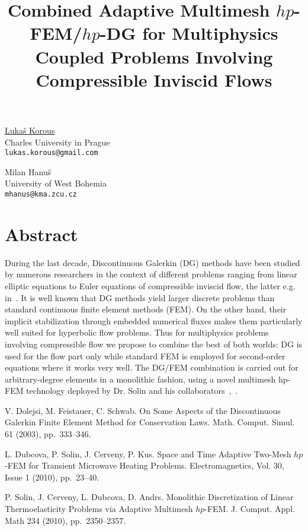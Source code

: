 \title{Combined Adaptive Multimesh $hp$-FEM/$hp$-DG for Multiphysics Coupled Problems Involving Compressible Inviscid Flows}
\author{} \institute{}
\maketitle

\begin{center}
{\large \underline{Luka\v s Korous}}\\
Charles University in Prague\\
{\tt lukas.korous@gmail.com}\\
\vspace{4mm}

{\large Milan Hanu\v s}\\
University of West Bohemia\\
{\tt mhanus@kma.zcu.cz}
\end{center}

\section*{Abstract}
During the last decade, Discontinuous Galerkin (DG) methods have been studied by numerous researchers in the context of different problems ranging from linear elliptic equations to Euler equations of compressible inviscid flow, the latter e.g. in~\cite{korous1}. It is well known that DG methods yield larger discrete problems than standard continuous finite element methods (FEM). On the other hand, their implicit stabilization through embedded numerical fluxes makes them particularly well
suited for hyperbolic flow problems. Thus for multiphysics problems involving compressible flow we propose to combine the best of both worlds: DG is used for the flow part only while standard FEM is employed for second-order equations where it works very well. The DG/FEM combination is carried out for arbitrary-degree elements in a monolithic fashion, using a novel multimesh hp-FEM technology deployed by Dr. Solin and his collaborators~\cite{korous2},~\cite{korous3}.


\begin{thebibliography}{10}
{\sc V. Dolejsi, M. Feistauer, C. Schwab}. {On Some Aspects of the Discontinuous Galerkin Finite Element Method for Conservation Laws}. Math. Comput. Simul. 61 (2003), pp.~333--346.

{\sc L. Dubcova, P. Solin, J. Cerveny, P. Kus}. {Space and Time Adaptive Two-Mesh $hp$-FEM for Transient Microwave Heating Problems}. Electromagnetics, Vol. 30, Issue 1 (2010), pp.~23--40.

{\sc P. Solin, J. Cerveny, L. Dubcova, D. Andrs}. {Monolithic Discretization of Linear Thermoelasticity Problems via Adaptive Multimesh $hp$-FEM}. J. Comput. Appl. Math 234 (2010), pp.~2350--2357.
\end{thebibliography}